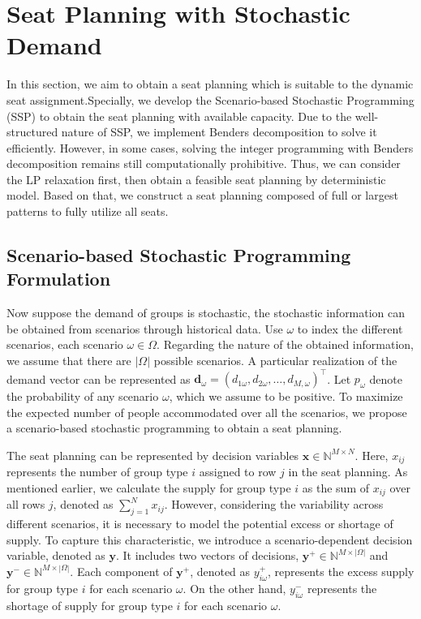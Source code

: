 

\section{Seat Planning with Stochastic Demand}\label{sec_seat_planning}
In this section, we aim to obtain a seat planning which is suitable to the dynamic seat assignment.Specially, we develop the Scenario-based Stochastic Programming (SSP) to obtain the seat planning with available capacity. Due to the well-structured nature of SSP, we implement Benders decomposition to solve it efficiently. However, in some cases, solving the integer programming with Benders decomposition remains still computationally prohibitive. Thus, we can consider the LP relaxation first, then obtain a feasible seat planning by deterministic model. Based on that, we construct a seat planning composed of full or largest patterns to fully utilize all seats.


\subsection{Scenario-based Stochastic Programming Formulation}
Now suppose the demand of groups is stochastic, the stochastic information can be obtained from scenarios through historical data. Use $\omega$ to index the different scenarios, each scenario $\omega \in \Omega$. Regarding the nature of the obtained information, we assume that there are $|\Omega|$ possible scenarios. A particular realization of the demand vector can be represented as $\mathbf{d}_\omega = (d_{1\omega},d_{2\omega},\ldots,d_{M,\omega})^{\intercal}$. Let $p_{\omega}$ denote the probability of any scenario $\omega$, which we assume to be positive. To maximize the expected number of people accommodated over all the scenarios, we propose a scenario-based stochastic programming to obtain a seat planning.

The seat planning can be represented by decision variables $\mathbf{x} \in \mathbb{N}^{M \times N}$. Here, $x_{ij}$ represents the number of group type $i$ assigned to row $j$ in the seat planning. As mentioned earlier, we calculate the supply for group type $i$ as the sum of $x_{ij}$ over all rows $j$, denoted as $\sum_{j=1}^N x_{ij}$. However, considering the variability across different scenarios, it is necessary to model the potential excess or shortage of supply. To capture this characteristic, we introduce a scenario-dependent decision variable, denoted as $\mathbf{y}$. 
It includes two vectors of decisions, $\mathbf{y}^{+} \in \mathbb{N}^{M \times |\Omega|}$ and $\mathbf{y}^{-} \in \mathbb{N}^{M \times |\Omega|}$. Each component of $\mathbf{y}^{+}$, denoted as $y_{i\omega}^{+}$, represents the excess supply for group type $i$ for each scenario $\omega$. On the other hand, $y_{i\omega}^{-}$ represents the shortage of supply for group type $i$ for each scenario $\omega$.


